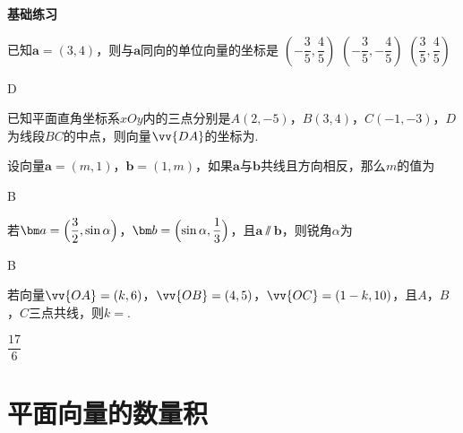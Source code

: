 \begin{Theorem}[平面向量基本定理]
\begin{exercise}{{\textbf{基础练习}}}
    \item%
      已知$\bm a=(3,4)$，则与$\bm a$同向的单位向量的坐标是\xz
       {$(-\dfrac{3}5,\dfrac{4}5)$}
       {$(-\dfrac{3}5,-\dfrac{4}5)$}
       {$(\dfrac{3}5,\dfrac{4}5)$}
      \begin{answer}
        D
      \end{answer}
    \item%
      已知平面直角坐标系$xOy$内的三点分别是$A(2,-5)$，$B(3,4)$，$C(-1,-3)$，$D$为线段$BC$的中点，则向量$\vv{DA}$的坐标为\tk.
    \item%
      设向量$\bm a=(m,1)$，$\bm b=(1,m)$，如果$\bm a$与$\bm b$共线且方向相反，那么$m$的值为\xz
      \begin{answer}
        B
      \end{answer}
    \item%
      若$\bm a=\Bigl(\dfrac{3}2,\sin\alpha\Bigr)$，$\bm b=\Bigl(\sin\alpha,\dfrac{1}3\Bigr)$，且$\bm a\varparallel \bm b$，则锐角$\alpha$为\xz
      \xx{30\degree}{45\degree}{60\degree}{75\degree}
      \begin{answer}
        B
      \end{answer}
    \item%
      若向量$\vv{OA}=(k,6)$，$\vv{OB}=(4,5)$，$\vv{OC}=(1-k,10)$，且$A$，$B$，$C$三点共线，则$k=$\tk.
      \begin{answer}
        $\dfrac{17}6$
      \end{answer}
  \end{exercise}
\section{平面向量的数量积}

\end{Theorem}
